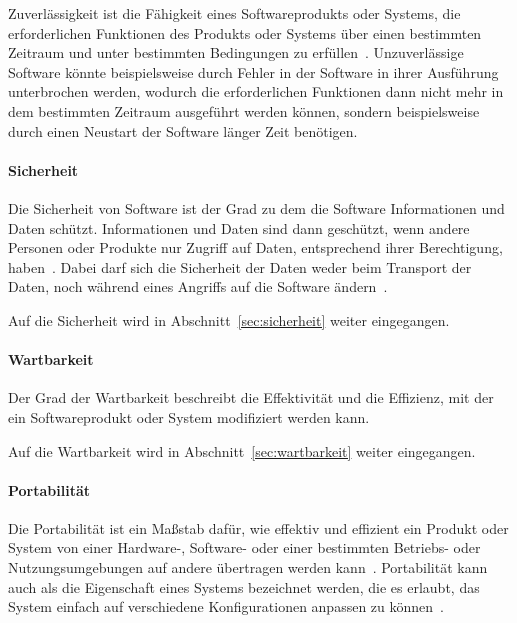 \documentclass[12pt, a4paper, ngerman]{article}
\begin{document}
Zuverlässigkeit ist die Fähigkeit eines Softwareprodukts oder Systems,
die erforderlichen Funktionen des Produkts oder Systems über einen bestimmten Zeitraum 
und unter bestimmten Bedingungen zu erfüllen~\cite{ISO25010}.
Unzuverlässige Software könnte beispielsweise durch Fehler in der Software
in ihrer Ausführung unterbrochen werden, wodurch die erforderlichen Funktionen
dann nicht mehr in dem bestimmten Zeitraum ausgeführt werden können,
sondern beispielsweise durch einen Neustart der Software länger Zeit benötigen.

\paragraph{Sicherheit}

Die Sicherheit von Software ist der Grad zu dem die Software Informationen und Daten schützt.
Informationen und Daten sind dann geschützt,
wenn andere Personen oder Produkte nur Zugriff auf Daten, 
entsprechend ihrer Berechtigung, haben~\cite{ISO25010}.
Dabei darf sich die Sicherheit der Daten weder beim Transport der Daten,
noch während eines Angriffs auf die Software ändern~\cite{ISO25010}.

Auf die Sicherheit wird in Abschnitt~\ref{sec:sicherheit} weiter eingegangen.

\paragraph{Wartbarkeit}

Der Grad der Wartbarkeit beschreibt die Effektivität und die Effizienz,
mit der ein Softwareprodukt oder System modifiziert werden kann.

Auf die Wartbarkeit wird in Abschnitt~\ref{sec:wartbarkeit} weiter eingegangen.

\paragraph{Portabilität}

Die Portabilität ist ein Maßstab dafür, 
wie effektiv und effizient ein Produkt oder System von einer Hardware-,
Software- oder einer bestimmten Betriebs- oder Nutzungsumgebungen auf andere übertragen werden kann~\cite{ISO25010}.
Portabilität kann auch als die Eigenschaft eines Systems bezeichnet werden,
die es erlaubt, das System einfach auf verschiedene Konfigurationen anpassen zu können~\cite{IEEE24765}.

\end{document}
